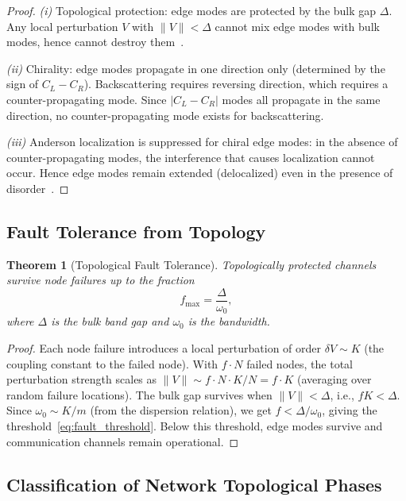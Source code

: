 \documentclass[11pt,twocolumn,a4paper]{article}
\newtheorem{theorem}{Theorem}[section]
\theoremstyle{definition}
\begin{document}
\begin{proof}
\emph{(i)} Topological protection: edge modes are protected by the bulk gap $\Delta$.
Any local perturbation $V$ with $\|V\| < \Delta$ cannot mix edge modes with bulk modes,
hence cannot destroy them~\cite{hasan2010}.

\emph{(ii)} Chirality: edge modes propagate in one direction only (determined by the
sign of $C_L - C_R$). Backscattering requires reversing direction, which requires a
counter-propagating mode. Since $|C_L - C_R|$ modes all propagate in the same direction,
no counter-propagating mode exists for backscattering.

\emph{(iii)} Anderson localization is suppressed for chiral edge modes: in the absence
of counter-propagating modes, the interference that causes localization cannot occur.
Hence edge modes remain extended (delocalized) even in the presence of
disorder~\cite{hasan2010}.
\end{proof}

\subsection{Fault Tolerance from Topology}\label{sec:topo:fault}

\begin{theorem}[Topological Fault Tolerance]\label{thm:topo_fault}
Topologically protected channels survive node failures up to the fraction
\begin{equation}\label{eq:fault_threshold}
  f_{\max} = \frac{\Delta}{\omega_0},
\end{equation}
where $\Delta$ is the bulk band gap and $\omega_0$ is the bandwidth.
\end{theorem}

\begin{proof}
Each node failure introduces a local perturbation of order $\delta V \sim K$ (the coupling
constant to the failed node). With $f \cdot N$ failed nodes, the total perturbation
strength scales as $\|V\| \sim f \cdot N \cdot K / N = f \cdot K$ (averaging over random
failure locations). The bulk gap survives when $\|V\| < \Delta$, i.e., $fK < \Delta$.
Since $\omega_0 \sim K/m$ (from the dispersion relation), we get $f < \Delta/\omega_0$,
giving the threshold~\eqref{eq:fault_threshold}. Below this threshold, edge modes survive
and communication channels remain operational.
\end{proof}

\subsection{Classification of Network Topological Phases}\label{sec:topo:classification}
\end{document}
